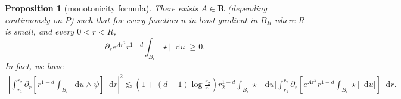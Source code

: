 \documentclass[reqno,12pt,letterpaper]{amsart}
\newcommand{\RR}{\mathbf{R}}
\newcommand*\dif{\mathop{}\!\mathrm{d}}
\newtheorem{proposition}[theorem]{Proposition}
\theoremstyle{definition}
\numberwithin{equation}{section}
\begin{document}
\begin{proposition}[monotonicity formula]\label{Monotonicity Formula}\label{sharp monotonicity}
There exists $A \in \RR$ (depending continuously on $P$) such that for every function $u$ in least gradient in $B_R$ where $R$ is small, and every $0 < r < R$,
\begin{equation}\label{weak monotone}
\partial_r e^{Ar^2} r^{1 - d} \int_{B_r} \star|\dif u| \geq 0.
\end{equation}
In fact, we have 
\begin{align*}
\left|\int_{r_1}^{r_2} \partial_r \left[r^{1 - d}\int_{B_r} \dif u \wedge \psi\right] \dif r\right|^2 \lesssim \left(1 + (d - 1)\log\frac{r_2}{r_1}\right)r_2^{1 - d}\int_{B_r} \star |\dif u| \int_{r_1}^{r_2} \partial_r \left[e^{Ar^2} r^{1 - d}\int_{B_r} \star |\dif u|\right] \dif r.
\end{align*}
\end{proposition}
\end{document}
